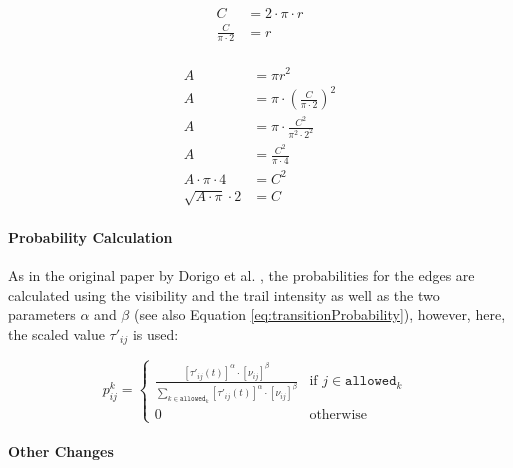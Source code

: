 \begin{minipage}[t][2.5cm][b]{0.4\textwidth}
	\begin{equation}
		\label{eq:scaleArea1}
		\begin{split}
			C &= 2 \cdot \pi \cdot r\\
			\frac{C}{\pi \cdot 2} &= r\\
		\end{split}
	\end{equation}
\end{minipage}
\begin{minipage}[t][2.5cm][b]{0.4\textwidth}
	\begin{equation}
		\label{eq:scaleArea2}
		\begin{split}
			A &= \pi r^2 \\
			A &= \pi \cdot \left(\frac{C}{\pi \cdot 2}\right)^2\\
			A &= \pi \cdot \frac{C^2}{\pi^2 \cdot 2^2}\\
			A &= \frac{C^2}{\pi \cdot 4}\\
			A \cdot \pi \cdot 4 &= C^2\\
			\sqrt{A \cdot \pi} \cdot 2 &= C
		\end{split}
	\end{equation}
\end{minipage}

\paragraph{Probability Calculation}

As in the original paper by Dorigo et al. \cite{dorigo_ant_1996}, the probabilities for the edges are calculated using the visibility and the trail intensity as well as the two parameters $\alpha$ and $\beta$ (see also Equation \ref{eq:transitionProbability}), however, here, the scaled value $\tau'_{ij}$ is used:

\begin{equation}\label{eq:transitionProbability2}
	p_{ij}^k = \begin{cases}
		\frac{[\tau'_{ij}(t)]^{\alpha} \cdot [\nu_{ij}]^{\beta}}{\sum_{k \in \texttt{allowed}_k} [\tau'_{ij}(t)]^{\alpha} \cdot [\nu_{ij}]^{\beta}} &\text{if $j \in \texttt{allowed}_k$ }\\
		0 &\text{otherwise}
	\end{cases}
\end{equation}

\paragraph{Other Changes}

